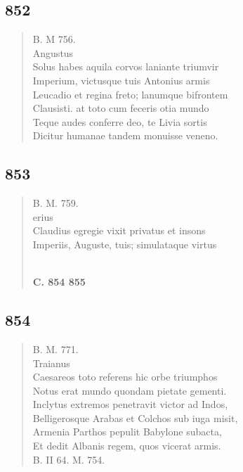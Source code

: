 \documentclass[11pt, a4paper]{report}
\begin{document}
            \subsection*{852}
      \begin{verse}
      B. M 756. \\ Angustus \\ Solus habes aquila corvos laniante triumvir \\ Imperium, victusque tuis Antonius armis \\ Leucadio et regina freto; lanumque bifrontem \\ Clausisti. at toto cum feceris otia mundo \\ Teque audes conferre deo, te Livia sortis \\ Dicitur humanae  \lbrack tandem \rbrack  monuisse veneno. \\ 
      \end{verse}
  
            \subsection*{853}
      \begin{verse}
      B. M. 759. \\ erius \\ Claudius egregie vixit privatus et insons \\ Imperiis, Auguste, tuis; simulataque virtus \\ 
        ﻿\pagebreak 
     \marginpar{[309]} \begin{center} \textbf{C. 854 855} \end{center}
      \end{verse}
  
            \subsection*{854}
      \begin{verse}
      B. M. 771. \\ Traianus \\ Caesareos toto referens hic orbe triumphos \\ Notus erat mundo quondam pietate gementi. \\ Inclytus extremos penetravit victor ad Indos, \\ Belligerosque Arabas et Colchos sub iuga misit, \\ Armenia Parthos pepulit Babylone subacta, \\ Et dedit Albanis regem, quos vicerat armis. \\ B. II 64. M. 754. \\ 
      \end{verse}
  
\end{document}
